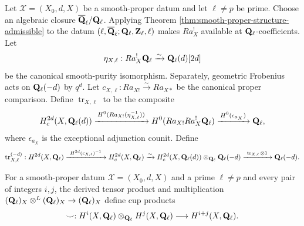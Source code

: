 \begin{definition}
\label{def:poincare-trace}


Let \(\mathscr X=(X_0,d,X)\) be a smooth-proper datum and let
\(\ell\neq p\) be prime.  Choose an algebraic closure \(\overline{\mathbf Q}_\ell/\mathbf Q_{\ell}\).
Applying Theorem
\ref{thm:smooth-proper-structure-admissible} to
the datum \((\ell,\overline{\mathbf Q}_\ell;\mathbf Q_{\ell},\mathbf Z_\ell,\ell)\) makes
\(Ra_X^!\) available at \(\mathbf Q_{\ell}\)-coefficients.  Let
\[
 \eta_{X,\ell}:Ra_X^!\mathbf Q_{\ell}\xrightarrow{\sim}\mathbf Q_{\ell}(d)[2d]
\]
be the canonical smooth-purity isomorphism.  Separately, geometric
Frobenius acts on \(\mathbf Q_{\ell}(-d)\) by \(q^d\).  Let
\(c_{X,\ell}:Ra_{X!}\xrightarrow{\sim}Ra_{X*}\) be the canonical proper
comparison.  Define \(\operatorname{tr}_{X,\ell}\) to be the composite
\[
 H_c^{2d}(X,\mathbf Q_{\ell}(d))
 \xrightarrow{\,H^0(Ra_{X!}(\eta_{X,\ell}^{-1}))\,}
 H^0(Ra_{X!}Ra_X^!\mathbf Q_{\ell})
 \xrightarrow{\,H^0(\epsilon_{a_X})\,}\mathbf Q_{\ell},
\]
where \(\epsilon_{a_X}\) is the exceptional adjunction counit.  Define
\[
 \operatorname{tr}^{(-d)}_{X,\ell}:
 H^{2d}(X,\mathbf Q_{\ell})
 \xrightarrow{\ H^{2d}(c_{X,\ell})^{-1}\ }
 H_c^{2d}(X,\mathbf Q_{\ell})
 \xrightarrow{\sim}
 H_c^{2d}(X,\mathbf Q_{\ell}(d))\otimes_{\mathbf Q_{\ell}}\mathbf Q_{\ell}(-d)
 \xrightarrow{\ \operatorname{tr}_{X,\ell}\otimes1\ }
 \mathbf Q_{\ell}(-d).
\]
\end{definition}


\begin{definition}
\label{def:cohomological-cup-product}


For a smooth-proper datum \(\mathscr X=(X_0,d,X)\) and a prime
\(\ell\neq p\) and every pair of integers \(i,j\), the
derived tensor product and multiplication
\((\mathbf Q_{\ell})_X\otimes^L(\mathbf Q_{\ell})_X\to(\mathbf Q_{\ell})_X\) define cup products
\[
 \smile:H^i(X,\mathbf Q_{\ell})\otimes_{\mathbf Q_{\ell}}H^j(X,\mathbf Q_{\ell})
 \longrightarrow H^{i+j}(X,\mathbf Q_{\ell}).
\]
\end{definition}

